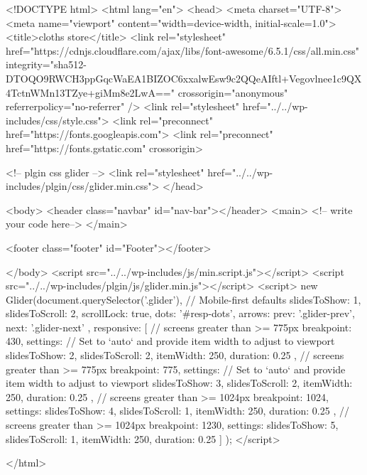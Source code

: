 <!DOCTYPE html>
<html lang="en">
<head>
    <meta charset="UTF-8">
    <meta name="viewport" content="width=device-width, initial-scale=1.0">
    <title>cloths store</title>
    <link rel="stylesheet" href="https://cdnjs.cloudflare.com/ajax/libs/font-awesome/6.5.1/css/all.min.css"
        integrity="sha512-DTOQO9RWCH3ppGqcWaEA1BIZOC6xxalwEsw9c2QQeAIftl+Vegovlnee1c9QX4TctnWMn13TZye+giMm8e2LwA=="
        crossorigin="anonymous" referrerpolicy="no-referrer" />
    <link rel="stylesheet" href="../../wp-includes/css/style.css">
    <link rel="preconnect" href="https://fonts.googleapis.com">
    <link rel="preconnect" href="https://fonts.gstatic.com" crossorigin>

    <!-- plgin css glider -->
    <link rel="stylesheet" href="../../wp-includes/plgin/css/glider.min.css">
</head>

<body>
    <header class="navbar" id="nav-bar"></header>
    <main>
<!-- write your code here-->
    </main>


    <footer class="footer" id="Footer"></footer>


</body>
<script src="../../wp-includes/js/min.script.js"></script>
<script src="../../wp-includes/plgin/js/glider.min.js"></script>
<script>
    new Glider(document.querySelector('.glider'), {
        // Mobile-first defaults
        slidesToShow: 1,
        slidesToScroll: 2,
        scrollLock: true,
        dots: '#resp-dots',
        arrows: {
            prev: '.glider-prev',
            next: '.glider-next'
        },
        responsive: [
            {
                // screens greater than >= 775px
                breakpoint: 430,
                settings: {
                    // Set to `auto` and provide item width to adjust to viewport
                    slidesToShow: 2,
                    slidesToScroll: 2,
                    itemWidth: 250,
                    duration: 0.25
                }
            },
            {
                // screens greater than >= 775px
                breakpoint: 775,
                settings: {
                    // Set to `auto` and provide item width to adjust to viewport
                    slidesToShow: 3,
                    slidesToScroll: 2,
                    itemWidth: 250,
                    duration: 0.25
                }
            }, {
                // screens greater than >= 1024px
                breakpoint: 1024,
                settings: {
                    slidesToShow: 4,
                    slidesToScroll: 1,
                    itemWidth: 250,
                    duration: 0.25
                }
            }, {
                // screens greater than >= 1024px
                breakpoint: 1230,
                settings: {
                    slidesToShow: 5,
                    slidesToScroll: 1,
                    itemWidth: 250,
                    duration: 0.25
                }
            }
        ]
    });
</script>

</html>